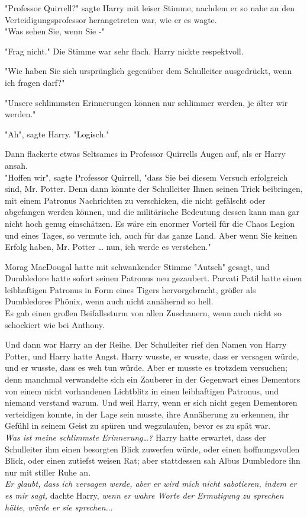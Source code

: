 {"Professor Quirrell?" sagte Harry mit leiser Stimme, nachdem er so nahe an den Verteidigungsprofessor herangetreten war, wie er es wagte.\\ "Was sehen Sie, wenn Sie -"

"Frag nicht." Die Stimme war sehr flach. Harry nickte respektvoll.

"Wie haben Sie sich ursprünglich gegenüber dem Schulleiter ausgedrückt, wenn ich fragen darf?"

"Unsere schlimmsten Erinnerungen können nur schlimmer werden, je älter wir werden."

"Ah", sagte Harry. "Logisch."

Dann flackerte etwas Seltsames in Professor Quirrells Augen auf, als er Harry ansah.\\ "Hoffen wir", sagte Professor Quirrell, "dass Sie bei diesem Versuch erfolgreich sind, Mr. Potter. Denn dann könnte der Schulleiter Ihnen seinen Trick beibringen, mit einem Patronus Nachrichten zu verschicken, die nicht gefälscht oder abgefangen werden können, und die militärische Bedeutung dessen kann man gar nicht hoch genug einschätzen. Es wäre ein enormer Vorteil für die Chaos Legion und eines Tages, so vermute ich, auch für das ganze Land. Aber wenn Sie keinen Erfolg haben, Mr. Potter … nun, ich werde es verstehen."

Morag MacDougal hatte mit schwankender Stimme "Autsch" gesagt, und Dumbledore hatte sofort seinen Patronus neu gezaubert. Parvati Patil hatte einen leibhaftigen Patronus in Form eines Tigers hervorgebracht, größer als Dumbledores Phönix, wenn auch nicht annähernd so hell.\\ Es gab einen großen Beifallssturm von allen Zuschauern, wenn auch nicht so schockiert wie bei Anthony.

Und dann war Harry an der Reihe. Der Schulleiter rief den Namen von Harry Potter, und Harry hatte Angst. Harry wusste, er wusste, dass er versagen würde, und er wusste, dass es weh tun würde. Aber er musste es trotzdem versuchen; denn manchmal verwandelte sich ein Zauberer in der Gegenwart eines Dementors von einem nicht vorhandenen Lichtblitz in einen leibhaftigen Patronus, und niemand verstand warum. Und weil Harry, wenn er sich nicht gegen Dementoren verteidigen konnte, in der Lage sein musste, ihre Annäherung zu erkennen, ihr Gefühl in seinem Geist zu spüren und wegzulaufen, bevor es zu spät war.\\ \emph{\hfill\break Was ist meine schlimmste Erinnerung…?} Harry hatte erwartet, dass der Schulleiter ihm einen besorgten Blick zuwerfen würde, oder einen hoffnungsvollen Blick, oder einen zutiefst weisen Rat; aber stattdessen sah Albus Dumbledore ihn nur mit stiller Ruhe an.\\ \emph{Er glaubt, dass ich versagen werde, aber er wird mich nicht sabotieren, indem er es mir sagt,} dachte Harry, \emph{wenn er wahre Worte der Ermutigung zu sprechen hätte, würde er sie sprechen.}..

}
